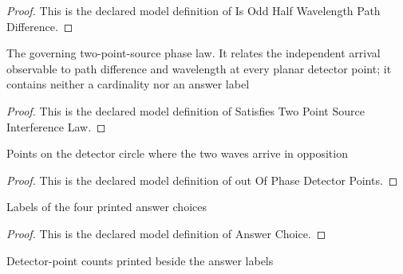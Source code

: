 \begin{proof}
  This is the declared model definition of Is Odd Half Wavelength Path Difference.
\end{proof}
\begin{definition}
  \label{def:physics:phyx-mini-0312:phyxminiproblems-problemphyxmini0312-satisfiestwopointsourceinterferencelaw}
  The governing two-point-source phase law. It relates the independent arrival observable to path difference and wavelength at every planar detector point; it contains neither a cardinality nor an answer label
\end{definition}
\begin{proof}
  This is the declared model definition of Satisfies Two Point Source Interference Law.
\end{proof}
\begin{definition}
  \label{def:physics:phyx-mini-0312:phyxminiproblems-problemphyxmini0312-outofphasedetectorpoints}
  Points on the detector circle where the two waves arrive in opposition
\end{definition}
\begin{proof}
  This is the declared model definition of out Of Phase Detector Points.
\end{proof}
\begin{definition}
  \label{def:physics:phyx-mini-0312:phyxminiproblems-problemphyxmini0312-answerchoice}
  Labels of the four printed answer choices
\end{definition}
\begin{proof}
  This is the declared model definition of Answer Choice.
\end{proof}
\begin{definition}
  \label{def:physics:phyx-mini-0312:phyxminiproblems-problemphyxmini0312-displayedpointcount}
  Detector-point counts printed beside the answer labels
\end{definition}
